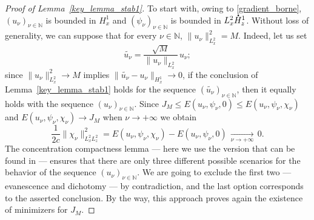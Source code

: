\documentclass[10pt]{amsart}
\theoremstyle{definition}
\newcommand*{\overbigdot}[1]{%
\accentset{\mbox{\large\bfseries .}}{#1}}
\newenvironment{ProofOf}[1]{\begin{proof}[Proof of #1]}{\end{proof}}
\newcommand{\N}{\mathbb{N}}
\begin{document}
\begin{ProofOf}{Lemma~\ref{key_lemma_stab1}}
To start with, owing to \eqref{gradient_borne}, $(u_{\nu})_{\nu\in\mathbb N}$ is bounded in $H_{x}^{1}$ and $(\psi_{\nu})_{\nu\in\mathbb N}$ is bounded in $L_{x}^{2}\overbigdot{H}_{z}^{1}$.
Without loss of generality, we can suppose that for every $\nu\in\N$, $\|u_{\nu}\|_{L_{x}^{2}}^{2}=M$. Indeed, let us set\vspace*{-3pt}
\[
\widetilde{u_{\nu}}=\frac{\sqrt{M}}{\|u_{\nu}\|_{L_{x}^{2}}}\,u_{\nu};
\]
since $\|u_{\nu}\|_{L_{x}^{2}}^{2}\to M$ implies $\|\widetilde{u_{\nu}}-u_{\nu}\|_{H_{x}^{1}}\to 0$, if the conclusion of Lemma~\ref{key_lemma_stab1} holds for the sequence $(\widetilde{u_{\nu}})_{\nu\in \mathbb N}$, then it equally holds with the sequence $(u_{\nu})_{\nu\in \mathbb N}$.
Since $J_{M}\leq E(u_{\nu},\psi_{\nu},0)\leq E(u_{\nu},\psi_{\nu},\chi_{\nu})$ and $E(u_{\nu},\psi_{\nu},\chi_{\nu})\to J_{M}$ when $\nu\to+\infty$ we obtain\vspace*{-3pt}
\[
\frac{1}{2c}\|\chi_{\nu}\|_{L_{x}^{2}L_{z}^{2}}^{2}=E(u_{\nu},\psi_{\nu},\chi_{\nu})-E(u_{\nu},\psi_{\nu},0)\,\underset{\nu\to +\infty}{\to}\,0.
\]
The concentration compactness lemma \cite{PLLcc1, PLLcc2} --- here we use the version that can be found in \cite[Prop.\,1.7.6]{Caze} --- ensures that there are only three different possible scenarios for the behavior of the sequence $(u_{\nu})_{\nu\in\mathbb N}$.
We are going to exclude the first two --- evanescence and dichotomy --- by contradiction, and the last option corresponds to the asserted conclusion.
By the way, this approach proves again the existence of minimizers for $J_M$.


\end{ProofOf}
\end{document}
